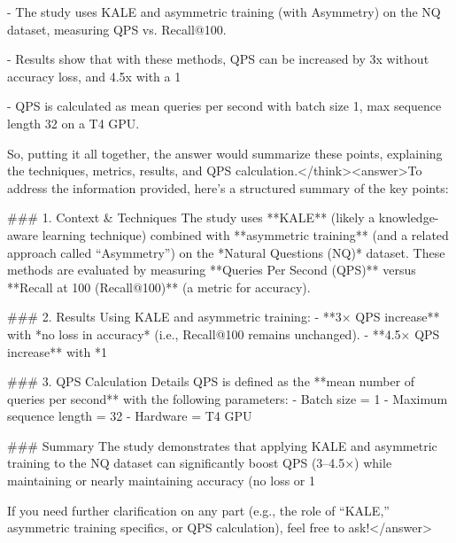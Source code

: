 - The study uses KALE and asymmetric training (with Asymmetry) on the NQ dataset, measuring QPS vs. Recall@100.

- Results show that with these methods, QPS can be increased by 3x without accuracy loss, and 4.5x with a 1%

- QPS is calculated as mean queries per second with batch size 1, max sequence length 32 on a T4 GPU.

So, putting it all together, the answer would summarize these points, explaining the techniques, metrics, results, and QPS calculation.</think><answer>To address the information provided, here’s a structured summary of the key points:  


### 1. Context & Techniques  
The study uses **KALE** (likely a knowledge-aware learning technique) combined with **asymmetric training** (and a related approach called “Asymmetry”) on the *Natural Questions (NQ)* dataset. These methods are evaluated by measuring **Queries Per Second (QPS)** versus **Recall at 100 (Recall@100)** (a metric for accuracy).  


### 2. Results  
Using KALE and asymmetric training:  
- **3× QPS increase** with *no loss in accuracy* (i.e., Recall@100 remains unchanged).  
- **4.5× QPS increase** with *1%


### 3. QPS Calculation Details  
QPS is defined as the **mean number of queries per second** with the following parameters:  
- Batch size = 1  
- Maximum sequence length = 32  
- Hardware = T4 GPU  


### Summary  
The study demonstrates that applying KALE and asymmetric training to the NQ dataset can significantly boost QPS (3–4.5×) while maintaining or nearly maintaining accuracy (no loss or 1%


If you need further clarification on any part (e.g., the role of “KALE,” asymmetric training specifics, or QPS calculation), feel free to ask!</answer>